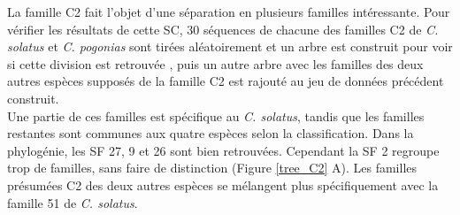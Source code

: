\documentclass[12pt,a4paper]{article}
\begin{document}
		La famille C2 fait l'objet d'une séparation en plusieurs familles intéressante. Pour vérifier les résultats de cette SC, 30 séquences de chacune des familles C2 de \textit{C. solatus} et \textit{C. pogonias} sont tirées aléatoirement et un arbre est construit pour voir si cette division est retrouvée , puis un autre arbre avec les familles des deux autres espèces supposés de la famille C2 est rajouté au jeu de données précédent construit.\\
		Une partie de ces familles est spécifique au \textit{C. solatus}, tandis que les familles restantes sont communes aux quatre espèces selon la classification. Dans la phylogénie, les SF 27, 9 et 26 sont bien retrouvées. Cependant la SF 2 regroupe trop de familles, sans faire de distinction (Figure \ref{tree_C2} A). Les familles présumées C2 des deux autres espèces se mélangent plus spécifiquement avec la famille 51 de \textit{C. solatus}.							
\end{document}
